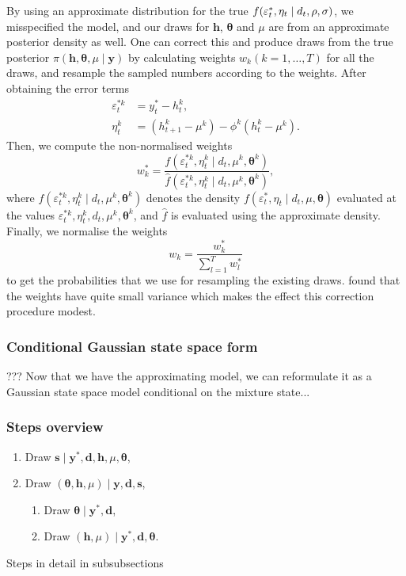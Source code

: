 By using an approximate distribution for the true $f(\varepsilon_t^\ast,\eta_t\mid d_t,\rho,\sigma)$, we misspecified the model, and our draws for $\bm{h}$, $\bm{\theta}$ and $\mu$ are from an approximate posterior density as well.
One can correct this and produce draws from the true posterior $\pi(\bm{h},\bm{\theta},\mu\mid\bm{y})$ by calculating weights $w_k (k=1,\dots,T)$ for all the draws, and resample the sampled numbers according to the weights.
After obtaining the error terms
\begin{align*}
\varepsilon_t^{\ast k} &= y_t^\ast-h_t^k, \\
\eta_t^k &= (h_{t+1}^k-\mu^k)-\phi^k(h_t^k-\mu^k).
\end{align*}
Then, we compute the non-normalised weights
\begin{equation*}
w_k^\ast=\frac{f(\varepsilon_t^{\ast k},\eta_t^k\mid d_t,\mu^k,\bm\theta^k)}{\hat f(\varepsilon_t^{\ast k},\eta_t^k\mid d_t,\mu^k,\bm\theta^k)},
\end{equation*}
where $f(\varepsilon_t^{\ast k},\eta_t^k\mid d_t,\mu^k,\bm\theta^k)$ denotes the density $f(\varepsilon_t^\ast,\eta_t\mid d_t,\mu,\bm\theta)$ evaluated at the values $\varepsilon_t^{\ast k},\eta_t^k,d_t,\mu^k,\bm\theta^k$, and $\hat f$ is evaluated using the approximate density.
Finally, we normalise the weights
\begin{equation*}
w_k=\frac{w_k^\ast}{\sum_{l=1}^{T}w_l^\ast}
\end{equation*}
to get the probabilities that we use for resampling the existing draws.
\citeauthor{Omori2007} found that the weights have quite small variance which makes the effect this correction procedure modest.

\subsubsection[State space form]{Conditional Gaussian state space form}

???
Now that we have the approximating model, we can reformulate it as a Gaussian state space model conditional on the mixture state...

\subsubsection{Steps overview}

\begin{enumerate}
	\item Draw $\bm{s}\mid\bm{y}^\ast,\bm{d},\bm{h},\mu,\bm\theta$,
	\item Draw $(\bm\theta,\bm h,\mu)\mid\bm y,\bm d,\bm s$,
	\begin{enumerate}
		\item Draw $\bm\theta\mid\bm{y}^\ast,\bm{d}$,
		\item Draw $(\bm{h},\mu)\mid\bm{y}^\ast,\bm{d},\bm\theta$.
	\end{enumerate}
\end{enumerate}

Steps in detail in subsubsections
